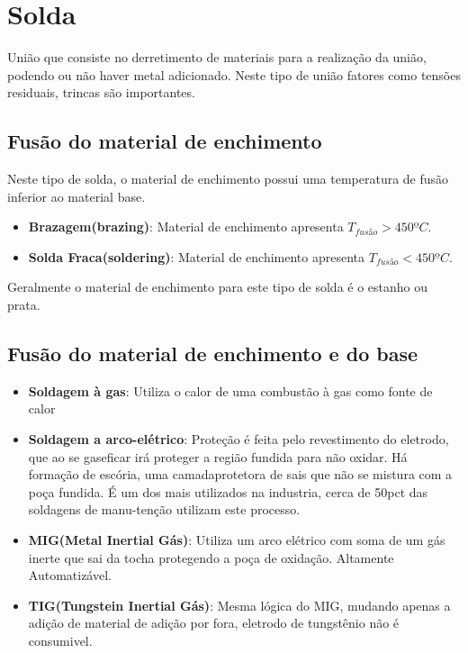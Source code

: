 \section{Solda}

União que consiste no derretimento de materiais para a realização da união, podendo ou não haver metal adicionado. Neste tipo de união fatores como tensões residuais, trincas são importantes.

\subsection{Fusão do material de enchimento}

Neste tipo de solda, o material de enchimento possui uma temperatura de fusão inferior ao material base.

\begin{itemize}
	\item \textbf{Brazagem(brazing)}: Material de enchimento apresenta $T_{fusão} > 450ºC$.
	\item \textbf{Solda Fraca(soldering)}: Material de enchimento apresenta $T_{fusão} < 450ºC$.
\end{itemize}

Geralmente o material de enchimento para este tipo de solda é o estanho ou prata.

\subsection{Fusão do material de enchimento e do base}

\begin{itemize}
	\item \textbf{Soldagem à gas}: Utiliza o calor de uma combustão à gas como fonte de calor
	\item \textbf{Soldagem a arco-elétrico}:  Proteção é feita pelo revestimento do eletrodo, que ao se gaseficar irá proteger a região fundida para não oxidar. Há formação de escória, uma camadaprotetora de sais que não se mistura com a poça fundida. É um dos mais utilizados na industria, cerca de 50pct das soldagens de manu-tenção utilizam este processo.
	\item \textbf{MIG(Metal Inertial Gás)}: Utiliza um arco elétrico com soma de um gás inerte que sai da tocha protegendo a poça de oxidação. Altamente Automatizável.
	\item \textbf{TIG(Tungstein Inertial Gás)}: Mesma lógica do MIG, mudando apenas a adição de material de adição por fora, eletrodo de tungstênio não é consumivel.
\end{itemize}

